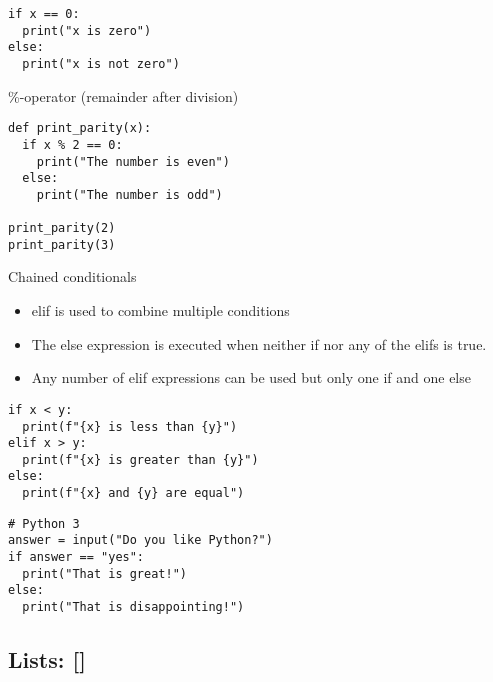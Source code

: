 \documentclass[10pt, a4paper]{beamer} %
\newcommand{\lb}[1]{{\color{mLightBrown}#1}}
\begin{document}
\begin{frame}
	\begin{lstlisting}
if x == 0:
  print("x is zero")
else:
  print("x is not zero")
\end{lstlisting}

	\framebreak

	\begin{examples}
		\begin{block}{\color{mLightBrown}\%-operator (remainder after division)}
			{}
		\end{block}
	\end{examples}
	\begin{lstlisting}
def print_parity(x):
  if x % 2 == 0:
    print("The number is even")
  else:
    print("The number is odd")

print_parity(2)
print_parity(3)
\end{lstlisting}

	\framebreak

	\begin{block}{Chained conditionals}
		\begin{itemize}
			\item \lb{elif} is used to combine multiple conditions
			\item The \lb{else} expression is executed when neither \lb{if} nor any of the \lb{elif}s is true.
			\item Any number of \lb{elif} expressions can be used but only one \lb{if} and one \lb{else}
		\end{itemize}
	\end{block}


	\framebreak

	\begin{examples}
		\begin{lstlisting}
if x < y:
  print(f"{x} is less than {y}")
elif x > y:
  print(f"{x} is greater than {y}")
else:
  print(f"{x} and {y} are equal")
\end{lstlisting}
		\begin{lstlisting}
# Python 3
answer = input("Do you like Python?")
if answer == "yes":
  print("That is great!")
else:
  print("That is disappointing!")
\end{lstlisting}
	\end{examples}
\end{frame}

\subsection{Lists: []} %
\label{sub:lists}
\end{document}
